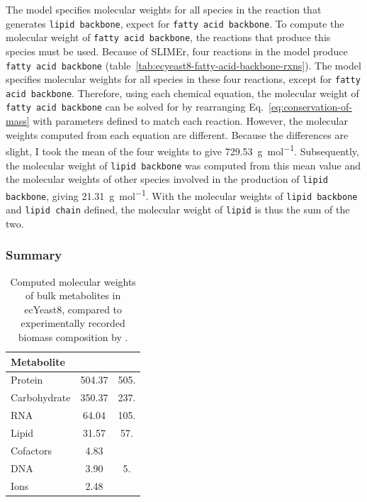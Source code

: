The model specifies molecular weights for all species in the reaction that generates \texttt{lipid backbone}, expect for \texttt{fatty acid backbone}.
To compute the molecular weight of \texttt{fatty acid backbone}, the reactions that produce this species must be used.
Because of SLIMEr, four reactions in the model produce \texttt{fatty acid backbone} (table~\ref{tab:ecyeast8-fatty-acid-backbone-rxns}).
The model specifies molecular weights for all species in these four reactions, except for \texttt{fatty acid backbone}.
Therefore, using each chemical equation, the molecular weight of \texttt{fatty acid backbone} can be solved for by rearranging Eq.\ \ref{eq:conservation-of-mass} with parameters defined to match each reaction.
However, the molecular weights computed from each equation are different.%
Because the differences are slight, %
I took the mean of the four weights to give \SI{729.53}{\gram~\mole^{-1}}.
Subsequently, the molecular weight of \texttt{lipid backbone} was computed from this mean value and the molecular weights of other species involved in the production of \texttt{lipid backbone}, giving \SI{21.31}{\gram~\mole^{-1}}.
With the molecular weights of \texttt{lipid backbone} and \texttt{lipid chain} defined, the molecular weight of \texttt{lipid} is thus the sum of the two.


\subsubsection{Summary}
\label{subsubsec:model-yeast8-molweight-summary}

\begin{table}[ht]
  \centering
  \begin{tabular}{lSS}
    Metabolite & {} & {} \\
    \hline
    Protein & 504.37 & 505.\\
    Carbohydrate & 350.37 & 237.\\
    RNA & 64.04 & 105.\\
    Lipid & 31.57 & 57.\\
    Cofactors & 4.83 & \\
    DNA & 3.90 & 5. \\
    Ions & 2.48 &
  \end{tabular}
  \caption{
    Computed molecular weights of bulk metabolites in ecYeast8, compared to experimentally recorded biomass composition by \textcite{canelasVivoDatadrivenFramework2011}.
  }
  \label{tab:ecyeast8-mol-weights}
\end{table}

